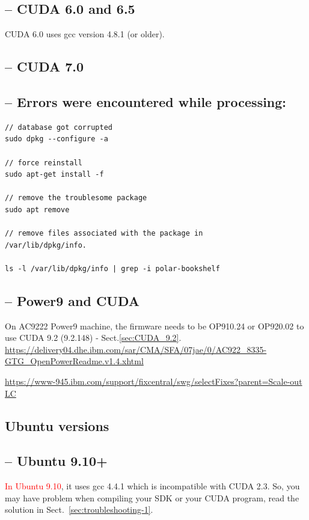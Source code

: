 \subsection{-- CUDA 6.0 and 6.5}

CUDA 6.0 uses gcc version 4.8.1 (or older).

\subsection{-- CUDA 7.0}
\label{sec:CUDA-7.0-troubleshoot}

\subsection{-- Errors were encountered while processing:}

\begin{verbatim}
// database got corrupted 
sudo dpkg --configure -a

// force reinstall
sudo apt-get install -f

// remove the troublesome package
sudo apt remove 

// remove files associated with the package in 
/var/lib/dpkg/info.

ls -l /var/lib/dpkg/info | grep -i polar-bookshelf

\end{verbatim}
\subsection{-- Power9 and CUDA}
\label{sec:power9-CUDA}

On AC9222 Power9 machine, the firmware needs to be OP910.24 or OP920.02 to use 
CUDA 9.2 (9.2.148) - Sect.\ref{sec:CUDA_9.2}. 
\url{https://delivery04.dhe.ibm.com/sar/CMA/SFA/07jae/0/AC922_8335-GTG_OpenPowerReadme.v1.4.xhtml}

\url{https://www-945.ibm.com/support/fixcentral/swg/selectFixes?parent=Scale-out LC}

\subsection{Ubuntu versions}
\label{sec:troubleshoot_Ubuntu_version}

\subsection{-- Ubuntu 9.10+}

\textcolor{red}{In Ubuntu 9.10}, it uses gcc 4.4.1 which is incompatible with
CUDA 2.3. So, you may have problem when compiling your SDK or your CUDA
program, read the solution in Sect.~\ref{sec:troubleshooting-1}.


